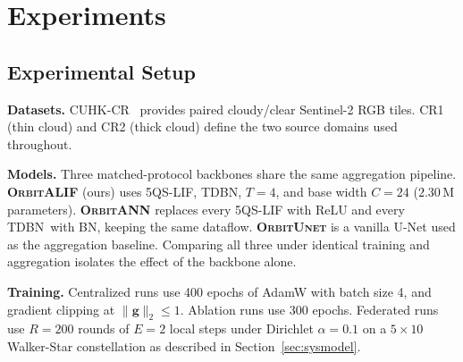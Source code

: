 \documentclass[conference]{IEEEtran}
\newcommand{\OrbitALIF}{\textsc{OrbitALIF}}
\newcommand{\OrbitANN}{\textsc{OrbitANN}}
\newcommand{\OrbitUnet}{\textsc{OrbitUnet}}
\newcommand{\FQS}{5QS}
\newcommand{\TDBN}{\textsc{TDBN}}
\begin{document}

\section{Experiments}\label{sec:experiments}

\subsection{Experimental Setup}

\noindent\textbf{Datasets.}
CUHK-CR~\cite{ref:cuhkcr} provides paired cloudy/clear Sentinel-2
RGB tiles. CR1 (thin cloud) and CR2 (thick cloud) define the two
source domains used throughout. 

\noindent\textbf{Models.}
Three matched-protocol backbones share the same aggregation pipeline.
\textbf{\OrbitALIF{}} (ours) uses \FQS-LIF, \TDBN, $T\!=\!4$,
and base width $C\!=\!24$ ($2.30$\,M parameters).
\textbf{\OrbitANN{}} replaces every \FQS-LIF with ReLU and
every \TDBN\ with BN, keeping the same dataflow.
\textbf{\OrbitUnet{}} is a vanilla U-Net used as the aggregation
baseline. Comparing all three under identical training and
aggregation isolates the effect of the backbone alone.

\noindent\textbf{Training.}
Centralized runs use 400 epochs of AdamW with batch size 4, and gradient clipping at $\|\mathbf{g}\|_2\leq 1$.
Ablation runs use 300 epochs. Federated runs use $R\!=\!200$ rounds
of $E\!=\!2$ local steps under Dirichlet $\alpha\!=\!0.1$ on a
$5{\times}10$ Walker-Star constellation as described in
Section~\ref{sec:sysmodel}.
\end{document}
